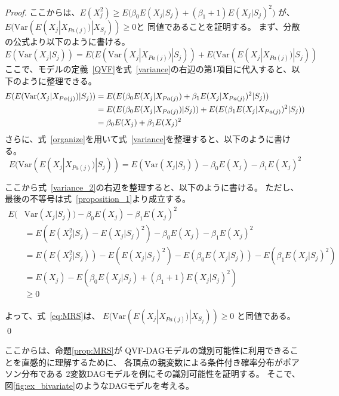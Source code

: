 \begin{proof}
  ここからは、$E(X_j^2) \geq E\bigl( \beta_0 E(X_j | S_j) +
  (\beta_1 + 1) E(X_j | S_j)^2 \bigl)$ が、
  $E(\mathrm{Var}( E(X_j | X_{Pa(j)}) | X_{S_j} )) \geq 0$と
  同値であることを証明する。
  まず、分散の公式より以下のように書ける。
  \begin{equation}
    \label{variance}
    E(\mathrm{Var}(X_j | S_j))
     = E(E(\mathrm{Var}(X_j | X_{Pa(j)}) | S_j)) + E(\mathrm{Var}(E(X_j | X_{Pa(j)}) | S_j))
  \end{equation}
  ここで、モデルの定義~\eqref{QVF}を式~\eqref{variance}の右辺の第1項目に代入すると、以下のように整理できる。
  \begin{align}
    E(E(\mathrm{Var}(X_j | X_{Pa(j)}) | S_j))
      &= E(E(\beta_0 E(X_j | X_{Pa(j)}) + \beta_1 E(X_j | X_{Pa(j)})^2 | S_j)) \notag \\
      &= E(E(\beta_0 E(X_j | X_{Pa(j)}) | S_j)) + E(E(\beta_1 E(X_j | X_{Pa(j)})^2 | S_j)) \notag \\
      &= \beta_0 E(X_j) + \beta_1 E(X_j)^2
      \label{organize}
  \end{align}
  さらに、式~\eqref{organize}を用いて式~\eqref{variance}を整理すると、以下のように書ける。
  \begin{equation}
    \label{variance_2}
    E(\mathrm{Var}(E(X_j | X_{Pa(j)}) | S_j))
     = E(\mathrm{Var}(X_j | S_j)) - \beta_0 E(X_j) - \beta_1 E(X_j)^2
  \end{equation}

  ここから式~\eqref{variance_2}の右辺を整理すると、以下のように書ける。
  ただし、最後の不等号は式~\eqref{proposition_1}より成立する。
  \begin{align*}
    E(&\mathrm{Var}(X_j | S_j)) - \beta_0 E(X_j) - \beta_1 E(X_j)^2 \\
     &= E(E(X_j^2 | S_j) - E(X_j | S_j)^2) - \beta_0 E(X_j) - \beta_1 E(X_j)^2 \\
     &= E(E(X_j^2 | S_j)) - E(E(X_j | S_j)^2) - E(\beta_0 E(X_j | S_j)) - E(\beta_1 E(X_j | S_j)^2) \\
     &= E(X_j) - E(\beta_0 E(X_j | S_j) + (\beta_1 + 1) E(X_j | S_j)^2) \\
     & \geq 0
  \end{align*}

  よって、式~\eqref{eq:MRS}は、
  $E(\mathrm{Var}( E(X_j | X_{Pa(j)}) | X_{S_j} )) \geq 0$
  と同値である。
  \qed

\end{proof}

ここからは、命題\ref{prop:MRS}が
QVF-DAGモデルの識別可能性に利用できることを直感的に理解するために、
各頂点の親変数による条件付き確率分布がポアソン分布である
2変数DAGモデルを例にその識別可能性を証明する。
そこで、図\ref{fig:ex_bivariate}のようなDAGモデルを考える。

